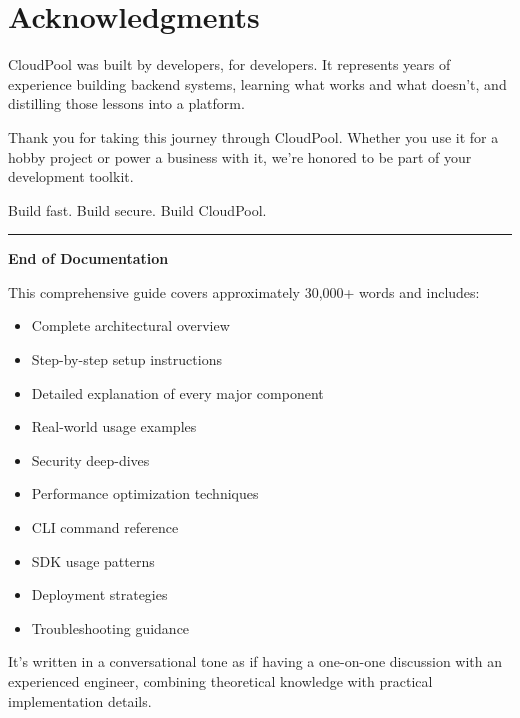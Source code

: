 \documentclass[11pt,a4paper]{report}
\begin{document}
\chapter{Acknowledgments}


CloudPool was built by developers, for developers. It represents years of experience building backend systems, learning what works and what doesn't, and distilling those lessons into a platform.

Thank you for taking this journey through CloudPool. Whether you use it for a hobby project or power a business with it, we're honored to be part of your development toolkit.

Build fast. Build secure. Build CloudPool.


\vfill\hrule\vfill


\textbf{End of Documentation}

This comprehensive guide covers approximately 30,000+ words and includes:

\begin{itemize}
\item Complete architectural overview
\item Step-by-step setup instructions
\item Detailed explanation of every major component
\item Real-world usage examples
\item Security deep-dives
\item Performance optimization techniques
\item CLI command reference
\item SDK usage patterns
\item Deployment strategies
\item Troubleshooting guidance

\end{itemize}
It's written in a conversational tone as if having a one-on-one discussion with an experienced engineer, combining theoretical knowledge with practical implementation details.
\end{document}
